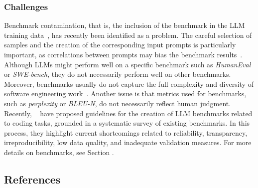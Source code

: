 \subsubsection{Challenges}

Benchmark contamination, that is, the inclusion of the benchmark in the LLM training data~\cite{DBLP:journals/corr/abs-2410-16186}, has recently been identified as a problem.
The careful selection of samples and the creation of the corresponding input prompts is particularly important, as correlations between prompts may bias the benchmark results~\cite{DBLP:conf/acl/SiskaMAB24}.
Although LLMs might perform well on a specific benchmark such as \emph{HumanEval} or \emph{SWE-bench}, they do not necessarily perform well on other benchmarks.
Moreover, benchmarks usually do not capture the full complexity and diversity of software engineering work~\cite{Chandra2025benchmarks}.
Another issue is that metrics used for benchmarks, such as \emph{perplexity} or \emph{BLEU-N}, do not necessarily reflect human judgment.
Recently, \citeauthor{cao2025should}~\cite{cao2025should} have proposed guidelines for the creation of LLM benchmarks related to coding tasks, grounded in a systematic survey of existing benchmarks. 
In this process, they highlight current shortcomings related to reliability, transparency, irreproducibility, low data quality, and inadequate validation measures.
For more details on benchmarks, see Section \benchmarksmetrics. 

\subsection{References}





